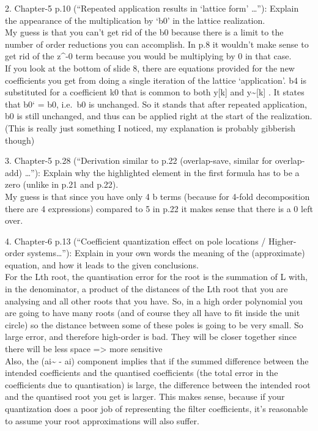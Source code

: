 \documentclass[
  a4paper,
  ,captions=tableheading
]{scrartcl}
\begin{document}
2. Chapter-5 p.10 (``Repeated application results in `lattice form'
\ldots''): Explain the appearance of the multiplication by `b0' in the
lattice realization.\\
My guess is that you can't get rid of the b0 because there is a limit to
the number of order reductions you can accomplish. In p.8 it wouldn't
make sense to get rid of the z\^{}-0 term because you would be
multiplying by 0 in that case.\\
If you look at the bottom of slide 8, there are equations provided for
the new coefficients you get from doing a single iteration of the
lattice `application'. b4 is substituted for a coefficient k0 that is
common to both y{[}k{]} and y\textasciitilde{[}k{]} . It states that b0`
= b0, i.e.~b0 is unchanged. So it stands that after repeated
application, b0 is still unchanged, and thus can be applied right at the
start of the realization. (This is really just something I noticed, my
explanation is probably gibberish though)

3. Chapter-5 p.28 (``Derivation similar to p.22 (overlap-save, similar
for overlap-add) \ldots''): Explain why the highlighted element in the
first formula has to be a zero (unlike in p.21 and p.22).\\
My guess is that since you have only 4 b terms (because for 4-fold
decomposition there are 4 expressions) compared to 5 in p.22 it makes
sense that there is a 0 left over.

4. Chapter-6 p.13 (``Coefficient quantization effect on pole locations /
Higher-order systems\ldots''): Explain in your own words the meaning of
the (approximate) equation, and how it leads to the given conclusions.\\
For the Lth root, the quantisation error for the root is the summation
of L with, in the denominator, a product of the distances of the Lth
root that you are analysing and all other roots that you have. So, in a
high order polynomial you are going to have many roots (and of course
they all have to fit inside the unit circle) so the distance between
some of these poles is going to be very small. So large error, and
therefore high-order is bad. They will be closer together since there
will be less space =\textgreater{} more sensitive\\
Also, the (ai\textasciitilde{} - ai) component implies that if the
summed difference between the intended coefficients and the quantised
coefficients (the total error in the coefficients due to quantisation)
is large, the difference between the intended root and the quantised
root you get is larger. This makes sense, because if your quantization
does a poor job of representing the filter coefficients, it's reasonable
to assume your root approximations will also suffer.
\end{document}
